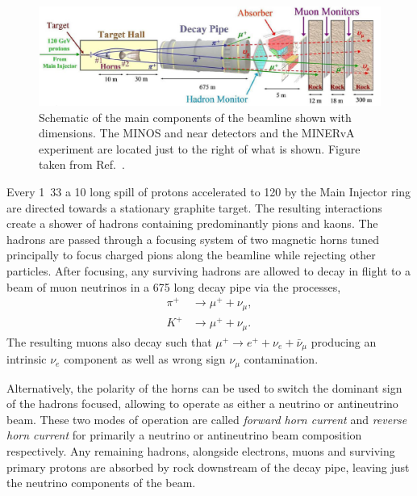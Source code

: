 \begin{figure} %
    \includegraphics[width=\textwidth]{diagrams/4-chips/numi_beam.png}
    \caption[Schematic of the main components of the \numi beam.]
    {Schematic of the main components of the \numi beamline shown with dimensions. The MINOS and
        \nova near detectors and the MINERvA experiment are located just to the right of what is
        shown. Figure taken from Ref.~\cite{adamson2016}.}
    \label{fig:numi_beam}
\end{figure}

Every \unit{1.33}{} a \unit{10}{\mu{}} long spill of protons accelerated
to \unit{120}{\GeV} by the Main Injector ring are directed towards a stationary graphite target.
The resulting interactions create a shower of hadrons containing predominantly pions and kaons.
The hadrons are passed through a focusing system of two magnetic horns tuned principally to focus
charged pions along the beamline while rejecting other particles. After focusing, any surviving
hadrons are allowed to decay in flight to a beam of muon neutrinos in a \unit{675}{}
long decay pipe via the processes,
\begin{align} %
    \pi^{+} & \rightarrow\mu^{+}+\nu_{\mu}, \label{eq:pi_decays}   \\
    K^{+}   & \rightarrow\mu^{+}+\nu_{\mu}. \label{eq:kaon_decays}
\end{align}
The resulting muons also decay such that $\mu^{+}\rightarrow e^{+}+\nu_{e}+\bar{\nu}_{\mu}$
producing an intrinsic $\nu_{e}$ component as well as wrong sign $\nu_{\mu}$ contamination.

Alternatively, the polarity of the horns can be used to switch the dominant sign of the hadrons
focused, allowing \numi to operate as either a neutrino or antineutrino beam. These two modes of
operation are called \emph{forward horn current} and \emph{reverse horn current} for primarily a
neutrino or antineutrino beam composition respectively. Any remaining hadrons, alongside
electrons, muons and surviving primary protons are absorbed by rock downstream of the decay pipe,
leaving just the neutrino components of the beam.

